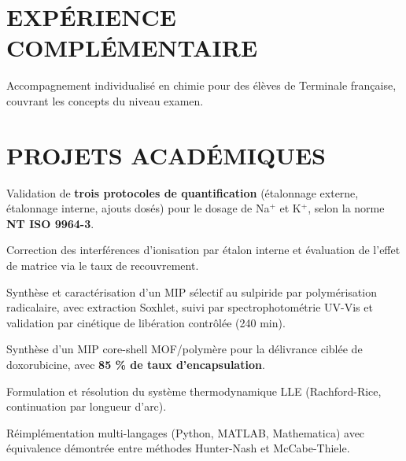 \documentclass[10pt]{article}
\begin{document}
\section{EXPÉRIENCE COMPLÉMENTAIRE}
\begin{bul}
\item Accompagnement individualisé en chimie pour des élèves de Terminale française, couvrant les concepts du niveau examen.
\end{bul}

\section{PROJETS ACADÉMIQUES}
\begin{bul}
\item Validation de \textbf{trois protocoles de quantification} (étalonnage externe, étalonnage interne, ajouts dosés) pour le dosage de Na$^+$ et K$^+$, selon la norme \textbf{NT ISO 9964-3}.
\item Correction des interférences d'ionisation par étalon interne et évaluation de l'effet de matrice via le taux de recouvrement.
\end{bul}
\begin{bul}
\item Synthèse et caractérisation d'un MIP sélectif au sulpiride par polymérisation radicalaire, avec extraction Soxhlet, suivi par spectrophotométrie UV-Vis et validation par cinétique de libération contrôlée (240 min).
\item Synthèse d'un MIP core-shell MOF/polymère pour la délivrance ciblée de doxorubicine, avec \textbf{85 \% de taux d'encapsulation}.
\end{bul}
\begin{bul}
\item Formulation et résolution du système thermodynamique LLE (Rachford-Rice, continuation par longueur d'arc).
\item Réimplémentation multi-langages (Python, MATLAB, Mathematica) avec équivalence démontrée entre méthodes Hunter-Nash et McCabe-Thiele.
\end{bul}
\end{document}
